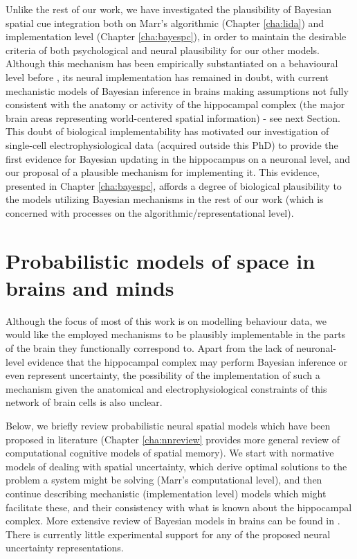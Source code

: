 Unlike the rest of our work, we have investigated the plausibility of Bayesian spatial cue integration both on Marr's algorithmic (Chapter \ref{cha:lida}) and implementation level (Chapter \ref{cha:bayespc}), in order to maintain the desirable criteria of both psychological and neural plausibility for our other models. Although this mechanism has been empirically substantiated on a behavioural level before \citep{cheng2007bayesian, nardini2008development}, its neural implementation has remained in doubt, with current mechanistic models of Bayesian inference in brains making assumptions not fully consistent with the anatomy or activity of the hippocampal complex (the major brain areas representing world-centered spatial information) - see next Section. This doubt of biological implementability has motivated our investigation of single-cell electrophysiological data (acquired outside this PhD) to provide the first evidence for Bayesian updating in the hippocampus on a neuronal level, and our proposal of a plausible mechanism for implementing it. This evidence, presented in Chapter \ref{cha:bayespc}, affords a degree of biological plausibility to the models utilizing Bayesian mechanisms in the rest of our work (which is concerned with processes on the algorithmic/representational level).


\section{Probabilistic models of space in brains and minds}
\label{sec:intro:uncertaintybrain} 

Although the focus of most of this work is on modelling behaviour data, we would like the employed mechanisms to be plausibly implementable in the parts of the brain they functionally correspond to. Apart from the lack of neuronal-level evidence that the hippocampal complex may perform Bayesian inference or even represent uncertainty, the possibility of the implementation of such a mechanism given the anatomical and electrophysiological constraints of this network of brain cells is also unclear. 

Below, we briefly review probabilistic neural spatial models which have been proposed in literature (Chapter \ref{cha:nnreview} provides more general review of computational cognitive models of spatial memory). We start with normative models of dealing with spatial uncertainty, which derive optimal solutions to the problem a system might be solving (Marr's computational level), and then continue describing mechanistic (implementation level) models which might facilitate these, and their consistency with what is known about the hippocampal complex. More extensive review of Bayesian models in brains can be found in \citep{pouget2013probabilistic, vilares2011bayesian}. There is currently little experimental support for any of the proposed neural uncertainty representations. %


